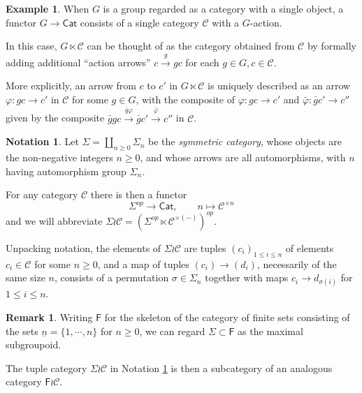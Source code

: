\documentclass[a4paper,10pt
,draft
]{article}%
\numberwithin{equation}{section}
\numberwithin{figure}{section}
\theoremstyle{definition} %
\newtheorem{example}[equation]{Example}%
\newtheorem{remark}[equation]{Remark}%
\newtheorem{notation}[equation]{Notation}%
\newcommand{\longto}{\longrightarrow}%
\newcommand{\Cat}{\mathsf{Cat}}
\newcommand{\C}{\ensuremath{\mathcal C}}
\newcommand{\1}{\ensuremath{\mathbbm 1}}%
\begin{document}
\begin{example}\label{GLTIMES EQ}
When $G$ is a group regarded as a category with a single object,
a functor
$G \to \mathsf{Cat}$
consists of a single category $\C$ with a $G$-action.

In this case, $G \ltimes \mathcal{C}$
can be thought of as the category obtained from $\mathcal{C}$
by formally adding additional
``action arrows''
$c \xrightarrow{g} gc$ for each $g\in G,c\in \mathcal{C}$.

More explicitly, an arrow from $c$ to $c'$
in $G \ltimes \mathcal{C}$
is uniquely described as an arrow
$\varphi \colon gc \to c'$ in $\mathcal{C}$ for some $g \in G$,
with the composite of 
$\varphi \colon gc \to c'$
and
$\bar{\varphi} \colon \bar{g}c' \to c''$
given by
the composite
$ \bar{g}g c \xrightarrow{\bar{g} \varphi} \bar{g}c' \xrightarrow{\bar{\varphi}} c''$ in $\C$.
\end{example}





\begin{notation}\label{SIGWR NOT}
Let $\Sigma = \coprod_{n \geq 0} \Sigma_n$
be the \emph{symmetric category},
whose objects are the non-negative integers $n\geq 0$,
and whose arrows are all automorphisms,
with $n$ having automorphism group $\Sigma_n$.
 
For any category $\mathcal{C}$ there is then a functor
\begin{equation}
	\Sigma^{op} \longto \Cat,
	\qquad
	n \mapsto \mathcal C^{\times n}
\end{equation}
and we will abbreviate
$\Sigma \wr \C = 
\left(\Sigma^{op} \ltimes \mathcal C^{\times (-)}\right)^{op}$.

Unpacking notation, 
the elements of $\Sigma \wr \mathcal{C}$
are tuples
$(c_i)_{1 \leq i \leq n}$
of elements $c_i \in \mathcal{C}$ for some $n \geq 0$,
and a map of tuples $(c_i) \to (d_i)$, 
necessarily of the same size $n$,
consists of a permutation 
$\sigma \in \Sigma_n$
together with maps
$c_i \to d_{\sigma(i)}$
for $1 \leq i \leq n$.
\end{notation}




\begin{remark}\label{FWR REM}
Writing $\mathsf{F}$ for the skeleton of 
the category of finite sets consisting of the sets 
$\underline{n} = \{1,\cdots,n\}$ for $n \geq 0$,
we can regard
$\Sigma \subset \mathsf{F}$
as the maximal subgroupoid.

The tuple category $\Sigma \wr \mathcal{C}$
in Notation \ref{SIGWR NOT}
is then a subcategory of an analogous category
$\mathsf{F} \wr \mathcal{C}$.
\end{remark}
\end{document}
